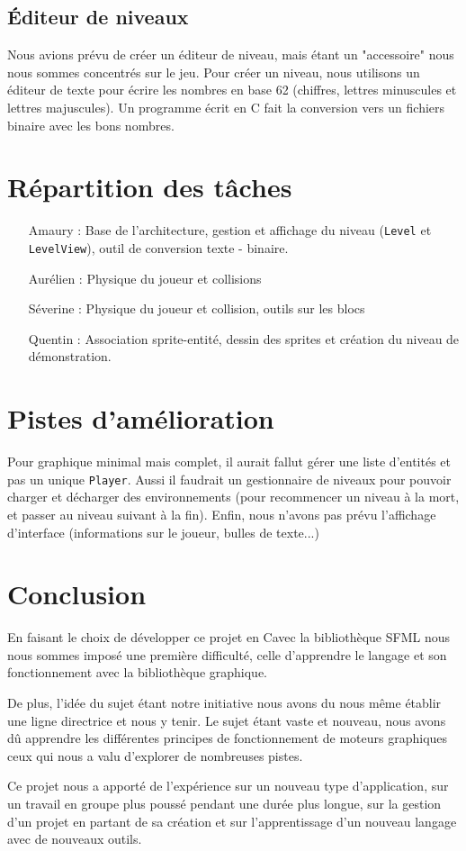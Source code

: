 \documentclass[a4paper,11pt]{article}
\newcommand{\CC}{C\nolinebreak\hspace{-.05em}\raisebox{.4ex}{\tiny\bf +}\nolinebreak\hspace{-.10em}\raisebox{.4ex}{\tiny\bf +}}
\begin{document}
\subsection{Éditeur de niveaux}
Nous avions prévu de créer un éditeur de niveau, mais étant un "accessoire" nous nous sommes concentrés sur le jeu. Pour créer un niveau, nous utilisons un éditeur de texte pour écrire les nombres en base 62 (chiffres, lettres minuscules et lettres majuscules). Un programme écrit en C fait la conversion vers un fichiers binaire avec les bons nombres.

\section{Répartition des tâches}
\begin{itemize}
\item[Amaury :] Base de l'architecture, gestion et affichage du niveau (\texttt{Level} et \texttt{LevelView}), outil de conversion texte - binaire.
\item[Aurélien :] Physique du joueur et collisions 
\item[Séverine :] Physique du joueur et collision, outils sur les blocs
\item[Quentin :] Association sprite-entité, dessin des sprites et création du niveau de démonstration.
\end{itemize}

    
\section{Pistes d'amélioration}
Pour graphique minimal mais complet, il aurait fallut gérer une liste d'entités et pas un unique \texttt{Player}.
\newline Aussi il faudrait un gestionnaire de niveaux pour pouvoir charger et décharger des environnements (pour recommencer un niveau à la mort, et passer au niveau suivant à la fin).
\newline Enfin, nous n'avons pas prévu l'affichage d'interface (informations sur le joueur, bulles de texte...)

\section{Conclusion}
En faisant le choix de développer ce projet en \CC avec la bibliothèque SFML nous nous sommes imposé une première difficulté, celle d'apprendre le langage et son fonctionnement avec la bibliothèque graphique.

De plus, l'idée du sujet étant notre initiative nous avons du nous même établir une ligne directrice et nous y tenir.
Le sujet étant vaste et nouveau, nous avons dû apprendre les différentes principes de fonctionnement de moteurs graphiques ceux qui nous a valu d'explorer de nombreuses pistes.

Ce projet nous a apporté de l'expérience sur un nouveau type d'application, sur un travail en groupe plus poussé pendant une durée plus longue, sur la gestion d'un projet en partant de sa création et sur l'apprentissage d'un nouveau langage avec de nouveaux outils.
\end{document}
